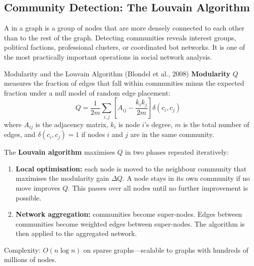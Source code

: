 \subsection{Community Detection: The Louvain Algorithm}
\label{subsec:community}

A  in a graph is a group of nodes that are more densely
connected to each other than to the rest of the graph. Detecting communities
reveals interest groups, political factions, professional clusters, or
coordinated bot networks. It is one of the most practically important
operations in social network analysis.

\begin{defbox}{Modularity and the Louvain Algorithm (Blondel et al., 2008)}
\textbf{Modularity} $Q$ measures the fraction of edges that fall within
communities minus the expected fraction under a null model of random
edge placement:
\[
  Q = \frac{1}{2m} \sum_{i,j}
  \left[ A_{ij} - \frac{k_i k_j}{2m} \right] \delta(c_i, c_j)
\]
where $A_{ij}$ is the adjacency matrix, $k_i$ is node $i$'s degree,
$m$ is the total number of edges, and $\delta(c_i, c_j) = 1$ if nodes
$i$ and $j$ are in the same community.

The \textbf{Louvain algorithm} maximises $Q$ in two phases repeated
iteratively:
\begin{enumerate}
  \item \textbf{Local optimisation:} each node is moved to the neighbour
        community that maximises the modularity gain $\Delta Q$. A node
        stays in its own community if no move improves $Q$. This passes
        over all nodes until no further improvement is possible.
  \item \textbf{Network aggregation:} communities become super-nodes.
        Edges between communities become weighted edges between
        super-nodes. The algorithm is then applied to the aggregated
        network.
\end{enumerate}
Complexity: $O(n \log n)$ on sparse graphs---scalable to graphs with
hundreds of millions of nodes.
\end{defbox}

